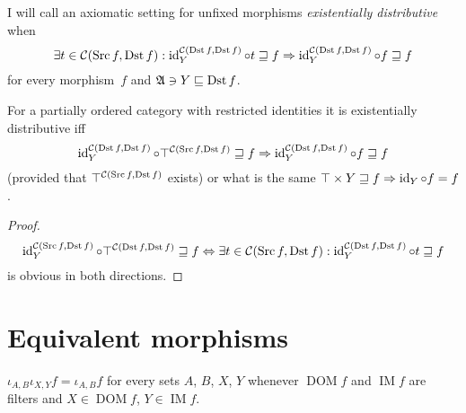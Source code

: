 \begin{prop}
I will call an axiomatic setting for unfixed morphisms
\emph{existentially distributive} when
\[\exists t\in\mathcal{C}(\operatorname{Src} f,\operatorname{Dst} f) : \operatorname{id}^{\mathcal{C}(\operatorname{Dst} f,\operatorname{Dst} f)}_Y \circ t \sqsupseteq f \Rightarrow \operatorname{id}^{\mathcal{C}(\operatorname{Dst} f,\operatorname{Dst} f)}_Y \circ f
\sqsupseteq f\]
for every morphism~$f$ and $\mathfrak{A}\ni Y\sqsubseteq\operatorname{Dst} f$.
\end{prop}

\begin{prop}
For a partially ordered category with restricted identities
it is existentially distributive iff
\[\operatorname{id}^{\mathcal{C}(\operatorname{Dst} f,\operatorname{Dst} f)}_Y \circ \top^{\mathcal{C}(\operatorname{Src} f,\operatorname{Dst} f)} \sqsupseteq f \Rightarrow \operatorname{id}^{\mathcal{C}(\operatorname{Dst} f,\operatorname{Dst} f)}_Y \circ f
\sqsupseteq f\] (provided that $\top^{\mathcal{C}(\operatorname{Src} f,\operatorname{Dst} f)}$
exists) or what is the same
$\top\times Y \sqsupseteq f \Rightarrow \operatorname{id}_Y \circ f
= f$.
\end{prop}

\begin{proof}
\[\operatorname{id}^{\mathcal{C}(\operatorname{Src} f,\operatorname{Dst} f)}_Y \circ \top^{\mathcal{C}(\operatorname{Dst} f,\operatorname{Dst} f)} \sqsupseteq f \Leftrightarrow
\exists t\in\mathcal{C}(\operatorname{Src} f,\operatorname{Dst} f) : \operatorname{id}^{\mathcal{C}(\operatorname{Dst} f,\operatorname{Dst} f)}_Y \circ t \sqsupseteq f\]
is obvious in both directions.
\end{proof}

\section{Equivalent morphisms}

\begin{prop}\label{two-iotas}
  $\iota_{A, B} \iota_{X, Y} f = \iota_{A, B} f$ for every sets $A$, $B$, $X$,
  $Y$ whenever $\operatorname{DOM} f$ and $\operatorname{IM} f$ are filters and $X \in
  \operatorname{DOM} f$, $Y \in \operatorname{IM} f$.
\end{prop}

